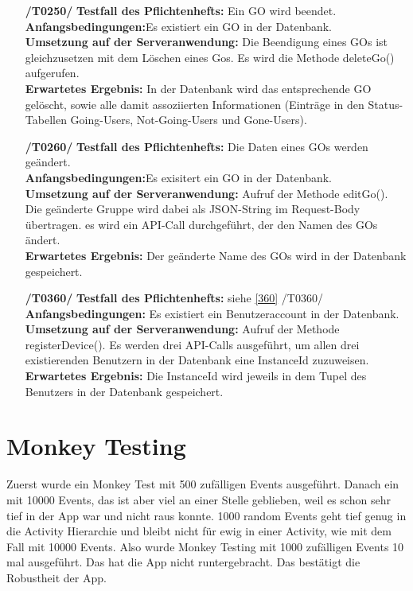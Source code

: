 \documentclass[11pt,a4paper]{scrartcl}
\begin{document}
\begin{enumerate}
	\item[\textbf{/T0250/}]
	\textbf{Testfall des Pflichtenhefts: }Ein GO wird beendet.\\
	\textbf{Anfangsbedingungen:}Es existiert ein GO in der Datenbank.\\
	\textbf{Umsetzung auf der Serveranwendung: }Die Beendigung eines GOs ist gleichzusetzen mit dem Löschen eines Gos. Es wird die Methode deleteGo() aufgerufen.\\
	\textbf{Erwartetes Ergebnis: }In der Datenbank wird das entsprechende GO gelöscht, sowie alle damit assoziierten Informationen (Einträge in den Status-Tabellen Going-Users, Not-Going-Users und Gone-Users).
	
	\item[\textbf{/T0260/}]
	\textbf{Testfall des Pflichtenhefts: }Die Daten eines GOs werden geändert.\\
	\textbf{Anfangsbedingungen:}Es exisitert ein GO in der Datenbank.\\
	\textbf{Umsetzung auf der Serveranwendung: }Aufruf der Methode editGo(). Die geänderte Gruppe wird dabei als JSON-String im Request-Body übertragen. es wird ein API-Call durchgeführt, der den Namen des GOs ändert.\\
	\textbf{Erwartetes Ergebnis: }Der geänderte Name des GOs wird in der Datenbank gespeichert.
	
	\item[\textbf{/T0360/}]
	\textbf{Testfall des Pflichtenhefts: }siehe \ref{360} /T0360/\\
	\textbf{Anfangsbedingungen:} Es existiert ein Benutzeraccount in der Datenbank.\\
	\textbf{Umsetzung auf der Serveranwendung: }Aufruf der Methode registerDevice(). Es werden drei API-Calls ausgeführt, um allen drei existierenden Benutzern in der Datenbank eine InstanceId zuzuweisen.\\
	\textbf{Erwartetes Ergebnis: }Die InstanceId wird jeweils in dem Tupel des Benutzers in der Datenbank gespeichert.
	
\end{enumerate}

\newpage

\section{Monkey Testing}

Zuerst wurde ein Monkey Test mit 500 zufälligen Events ausgeführt. Danach ein mit 10000 Events, das ist aber viel an einer Stelle geblieben, weil es schon sehr tief in der App war und nicht raus konnte. 1000 random Events geht tief genug in die Activity Hierarchie und bleibt nicht für ewig in einer Activity, wie mit dem Fall mit 10000 Events. Also wurde Monkey Testing mit 1000 zufälligen Events 10 mal ausgeführt. Das hat die App nicht runtergebracht. Das bestätigt die Robustheit der App.
\end{document}
